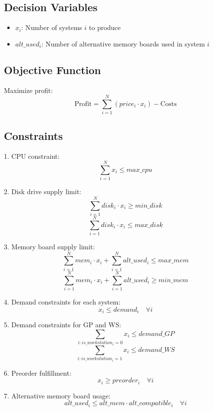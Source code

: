 \documentclass{article}
\begin{document}
\subsection*{Decision Variables}
\begin{itemize}
    \item $x_i$: Number of systems $i$ to produce
    \item $alt\_used_i$: Number of alternative memory boards used in system $i$
\end{itemize}

\subsection*{Objective Function}
Maximize profit:
\[
\text{Profit} = \sum_{i=1}^{N} (price_i \cdot x_i) - \text{Costs}
\]

\subsection*{Constraints}
1. CPU constraint:
\[
\sum_{i=1}^{N} x_i \leq max\_cpu
\]

2. Disk drive supply limit:
\[
\sum_{i=1}^{N} disk_i \cdot x_i \geq min\_disk
\]
\[
\sum_{i=1}^{N} disk_i \cdot x_i \leq max\_disk
\]

3. Memory board supply limit:
\[
\sum_{i=1}^{N} mem_i \cdot x_i + \sum_{i=1}^{N} alt\_used_i \leq max\_mem
\]
\[
\sum_{i=1}^{N} mem_i \cdot x_i + \sum_{i=1}^{N} alt\_used_i \geq min\_mem
\]

4. Demand constraints for each system:
\[
x_i \leq demand_i \quad \forall i
\]

5. Demand constraints for GP and WS:
\[
\sum_{i: is\_workstation_i=0} x_i \leq demand\_GP
\]
\[
\sum_{i: is\_workstation_i=1} x_i \leq demand\_WS
\]

6. Preorder fulfillment:
\[
x_i \geq preorder_i \quad \forall i
\]

7. Alternative memory board usage:
\[
alt\_used_i \leq alt\_mem \cdot alt\_compatible_i \quad \forall i
\]
\end{document}
